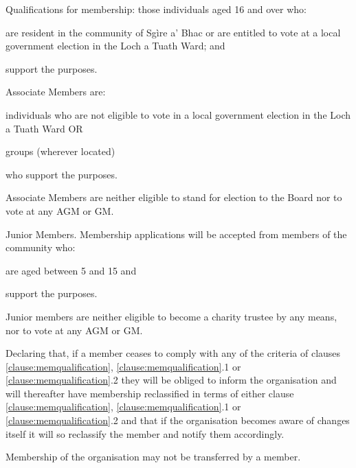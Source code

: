 ﻿\documentclass[a4paper,11pt,onecolumn ]{article}
\begin{document}
\begin{legal} %
\item \label{clause:memqualification} Qualifications for membership: those individuals aged 16 and over who:

    \begin{legal}[label=\alph*)]
    \item are resident in the community of Sgìre a’ Bhac or are entitled to vote at a local government election in the Loch a Tuath Ward; and
    \item support the purposes.
    \end{legal}
    
    \begin{legal}
    \item Associate Members are:
        \begin{legal}[label=\alph*)]
        \item individuals who are not eligible to vote in a local government election in the Loch a Tuath Ward OR 
        \item groups (wherever located)
        \end{legal}
    who support the purposes.

    Associate Members are neither eligible to stand for election to the Board nor to vote at any AGM or GM.

    \item Junior Members. Membership applications will be accepted from members of the community who:
        \begin{legal}[label=\alph*)]
        \item are aged between 5 and 15 and 
        \item support the purposes.
        \end{legal}

    Junior members are neither eligible to become a charity trustee by any means, nor to vote at any AGM or GM. 

    \item	Declaring that, if a member ceases to comply with any of the criteria of clauses \ref{clause:memqualification}, \ref{clause:memqualification}.1 or \ref{clause:memqualification}.2 they will be obliged to inform the organisation and will thereafter have membership reclassified in terms of either clause \ref{clause:memqualification}, \ref{clause:memqualification}.1 or \ref{clause:memqualification}.2 and that if the organisation becomes aware of changes itself it will so reclassify the member and notify them accordingly.

    \item Membership of the organisation may not be transferred by a member.
    \end{legal}
\end{legal}
\end{document}
